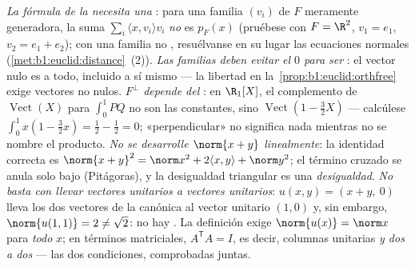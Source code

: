 \begin{remark}
\label{rem:b1:euclid:pitfalls}
\emph{La fórmula de la  necesita una  }:
para una familia $(v_i)$ de $F$ meramente generadora, la suma
$\sum_i\langle x, v_i\rangle v_i$ \emph{no} es $p_F(x)$ (pruébese con
$F = \R^2$, $v_1 = e_1$, $v_2 = e_1 + e_2$); con una familia
no , resuélvanse en su lugar las ecuaciones normales
(\cref{met:b1:euclid:distance}~(2)).
\emph{Las familias  deben evitar el $0$ para ser }:
el vector nulo es  a todo, incluido a sí mismo --- la
libertad en la~\cref{prop:b1:euclid:orthfree} exige vectores no nulos.
\emph{$F^\perp$ depende del }: en $\R_1[X]$, el
complemento de $\operatorname{Vect}(X)$ para $\int_0^1 PQ$ no son las
constantes, sino $\operatorname{Vect}(1 - \frac32 X)$ --- calcúlese
$\int_0^1 x(1 - \frac32 x) = \frac12 - \frac12 = 0$;
«perpendicular» no significa nada mientras no se nombre el producto.
\emph{No se desarrolle $\norm{x + y}$ linealmente}: la identidad
correcta es
$\norm{x+y}^2 = \norm x^2 + 2\langle x, y\rangle + \norm y^2$; el
término cruzado se anula solo bajo  (Pitágoras), y la
desigualdad triangular es una \emph{desigualdad}.
\emph{No basta con llevar vectores unitarios a vectores unitarios}:
$u(x, y) = (x + y,\ 0)$ lleva los dos vectores de la  canónica
al vector unitario $(1, 0)$ y, sin embargo,
$\norm{u(1,1)} = 2 \neq \sqrt2$: no hay . La definición
exige $\norm{u(x)} = \norm x$ para \emph{todo} $x$; en términos
matriciales, $A^{\mathsf T}A = I$, es decir, columnas unitarias
\emph{y  dos a dos} --- las dos condiciones, comprobadas
juntas.
\end{remark}

